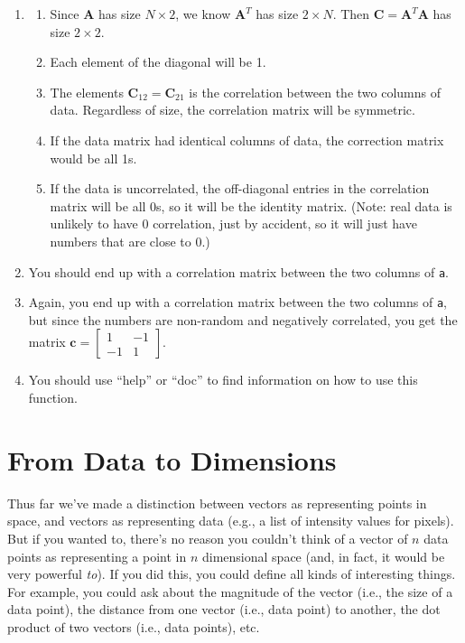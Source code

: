 \begin{sol}
\begin{enumerate}
    \item \begin{enumerate}
        \item Since $\mathbf{A}$ has size $N \times 2$, we know $\mathbf{A}^T$ has size $2 \times N$. Then $\mathbf{C} = \mathbf{A}^T\mathbf{A}$ has size $2 \times 2$.
        \item Each element of the diagonal will be 1.
        \item The elements $\mathbf{C}_{12}=\mathbf{C}_{21}$ is the correlation between the two columns of data. Regardless of size, the correlation matrix will be symmetric.
        \item If the data matrix had identical columns of data, the correction matrix would be all 1s.
        \item If the data is uncorrelated, the off-diagonal entries in the correlation matrix will be all 0s, so it will be the identity matrix. (Note: real data is unlikely to have 0 correlation, just by accident, so it will just have numbers that are close to 0.)
    \end{enumerate}
    \item You should end up with a correlation matrix between the two columns of \texttt{a}.
    \item Again, you end up with a correlation matrix between the two columns of \texttt{a}, but since the numbers are non-random and negatively correlated, you get the matrix $\mathbf{c}=\begin{bmatrix} 1 & -1 \\ -1 & 1\end{bmatrix}$.
    \item You should use ``help'' or ``doc'' to find information on how to use this function.
\end{enumerate}
\end{sol}

\section{From Data to Dimensions}

Thus far we've made a distinction between vectors as representing points in space, and vectors as representing data (e.g., a list of intensity values for pixels).  But if you wanted to, there's no reason you couldn't think of a vector of $n$ data points as representing a point in $n$ dimensional space (and, in fact, it would be very powerful \textit{to}).  If you did this, you could define all kinds of interesting things. For example, you could ask about the magnitude of the vector (i.e., the size of a data point), the distance from one vector (i.e., data point) to another, the dot product of two vectors (i.e., data points), etc.

